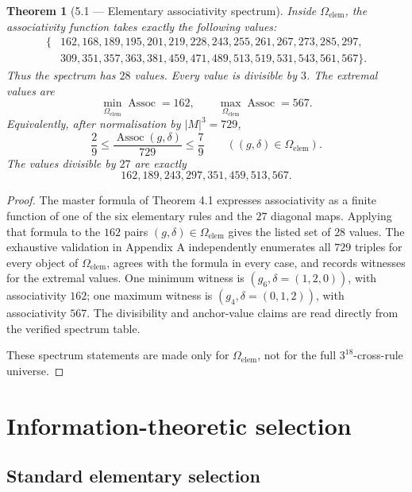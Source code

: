 \documentclass[11pt]{article}
\newtheorem*{theoremstar}{Theorem}
\begin{document}
\begin{theoremstar}[5.1 --- Elementary associativity spectrum]
Inside \(\Omega_{\mathrm{elem}}\), the associativity function takes exactly the following values:
\[
\begin{aligned}
\{&162,168,189,195,201,219,228,243,255,261,267,273,285,297,\\
&309,351,357,363,381,459,471,489,513,519,531,543,561,567\}.
\end{aligned}
\]
Thus the spectrum has \(28\) values. Every value is divisible by \(3\). The extremal values are
\[
\min_{\Omega_{\mathrm{elem}}}\operatorname{Assoc}=162,
\qquad
\max_{\Omega_{\mathrm{elem}}}\operatorname{Assoc}=567.
\]
Equivalently, after normalisation by \(|M|^3=729\),
\[
\frac{2}{9}\le
\frac{\operatorname{Assoc}(g,\delta)}{729}
\le
\frac{7}{9}
\qquad ((g,\delta)\in\Omega_{\mathrm{elem}}).
\]
The values divisible by \(27\) are exactly
\[
162,189,243,297,351,459,513,567.
\]

\end{theoremstar}
\begin{proof}
The master formula of Theorem 4.1 expresses associativity as a finite
function of one of the six elementary rules and the \(27\) diagonal maps. Applying
that formula to the \(162\) pairs \((g,\delta)\in\Omega_{\mathrm{elem}}\) gives the
listed set of \(28\) values. The exhaustive validation in Appendix A independently
enumerates all \(729\) triples for every object of \(\Omega_{\mathrm{elem}}\), agrees
with the formula in every case, and records witnesses for the extremal values.
One minimum witness is \((g_6,\delta=(1,2,0))\), with associativity \(162\); one
maximum witness is \((g_4,\delta=(0,1,2))\), with associativity \(567\). The
divisibility and anchor-value claims are read directly from the verified spectrum
table.

These spectrum statements are made only for \(\Omega_{\mathrm{elem}}\), not for the
full \(3^{18}\)-cross-rule universe.

\end{proof}


\section{Information-theoretic selection}

\subsection{Standard elementary selection}
\end{document}

